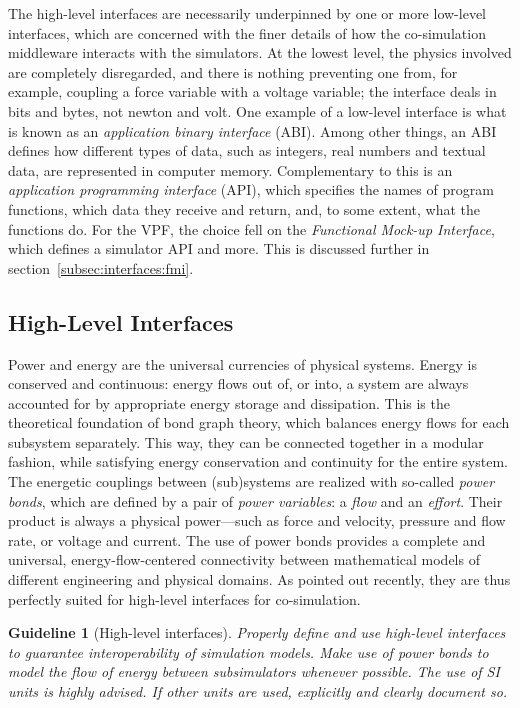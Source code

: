 \documentclass[prb,aps,showpacs,floatfix,twocolumn,10pt]{revtex4-1}
\newcommand{\sub}{subsimulator}
\newcommand{\guidelinePowerbonds}{%
	Properly define and use high-level interfaces to guarantee interoperability of simulation models.
	Make use of power bonds to model the flow of energy between \sub{}s whenever possible.
	The use of SI units is highly advised.
	If other units are used, explicitly and clearly document so.
}
\theoremstyle{plain}
\newtheorem{guideline}{Guideline}
\theoremstyle{remark}
\begin{document}
The high-level interfaces are necessarily underpinned by one or more low-level interfaces, which are concerned with the finer details of how the co-simulation middleware interacts with the simulators.
At the lowest level, the physics involved are completely disregarded, and there is nothing preventing one from, for example, coupling a force variable with a voltage variable;
the interface deals in bits and bytes, not newton and volt.
One example of a low-level interface is what is known as an \emph{application binary interface} (ABI).
Among other things, an ABI defines how different types of data, such as integers, real numbers and textual data, are represented in computer memory.
Complementary to this is an \emph{application programming interface} (API), which specifies the names of program functions, which data they receive and return, and, to some extent, what the functions do.
For the VPF, the choice fell on the \emph{Functional Mock-up Interface}, which defines a simulator API and more.
This is discussed further in section~\ref{subsec:interfaces:fmi}.


\subsection{High-Level Interfaces}
\label{subsec:interfaces:high-level}

Power and energy are the universal currencies of physical systems.
Energy is conserved and continuous:
energy flows out of, or into, a system are always accounted for by appropriate energy storage and dissipation.
This is the theoretical foundation of bond graph theory\cite{Paynter1961,Breedveld1984}, which balances energy flows for each subsystem separately.
This way, they can be connected together in a modular fashion, while satisfying energy conservation and continuity for the entire system.
The energetic couplings between (sub)systems are realized with so-called \emph{power bonds}, which are defined by a pair of \emph{power variables}: a \emph{flow} and an \emph{effort}.
Their product is always a physical power---such as force and velocity, pressure and flow rate, or voltage and current.
The use of power bonds provides a complete and universal, energy-flow-centered connectivity between mathematical models of different engineering and physical domains.
As pointed out recently\cite{Sadjina2016}, they are thus perfectly suited for high-level interfaces for co-simulation.

\begin{guideline}[High-level interfaces]
\label{guideline:Powerbonds}
	\guidelinePowerbonds{}
\end{guideline}
\end{document}
